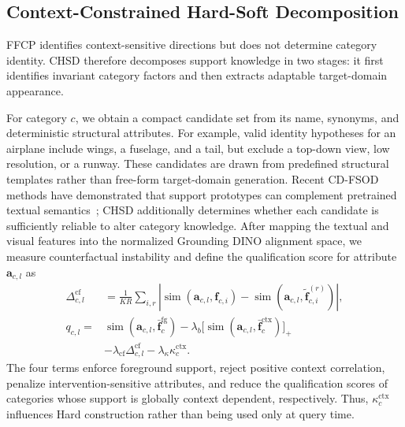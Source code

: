 \subsection{Context-Constrained Hard-Soft Decomposition}
\label{sec:chsd}

FFCP identifies context-sensitive directions but does not determine category identity. CHSD therefore decomposes support knowledge in two stages: it first identifies invariant category factors and then extracts adaptable target-domain appearance.

For category $c$, we obtain a compact candidate set from its name, synonyms, and deterministic structural attributes. For example, valid identity hypotheses for an airplane include wings, a fuselage, and a tail, but exclude a top-down view, low resolution, or a runway. These candidates are drawn from predefined structural templates rather than free-form target-domain generation. Recent CD-FSOD methods have demonstrated that support prototypes can complement pretrained textual semantics~\cite{lmp,astigmatism}; CHSD additionally determines whether each candidate is sufficiently reliable to alter category knowledge. After mapping the textual and visual features into the normalized Grounding DINO alignment space, we measure counterfactual instability and define the qualification score for attribute $\mathbf a_{c,l}$ as
\begin{equation}
\begin{aligned}
\Delta_{c,l}^{\mathrm{cf}}
&=\frac{1}{KR}\sum_{i,r}
\left|
\operatorname{sim}(\mathbf a_{c,l},\mathbf f_{c,i})
-\operatorname{sim}(\mathbf a_{c,l},
\tilde{\mathbf f}_{c,i}^{(r)})
\right|,\\
q_{c,l}={}&
\operatorname{sim}(\mathbf a_{c,l},\bar{\mathbf f}_c^{\mathrm{fg}})
-\lambda_b
\big[\operatorname{sim}(\mathbf a_{c,l},
\bar{\mathbf f}_c^{\mathrm{ctx}})\big]_+\\
&-\lambda_{\mathrm{cf}}\Delta_{c,l}^{\mathrm{cf}}
-\lambda_\kappa\kappa_c^{\mathrm{ctx}}.
\end{aligned}
\label{eq:hard_qualification}
\end{equation}
The four terms enforce foreground support, reject positive context correlation, penalize intervention-sensitive attributes, and reduce the qualification scores of categories whose support is globally context dependent, respectively. Thus, $\kappa_c^{\mathrm{ctx}}$ influences Hard construction rather than being used only at query time.

